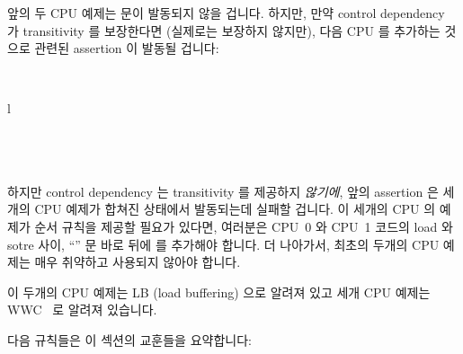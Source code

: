 \begin{enumerate}
앞의 두 CPU 예제는  문이 발동되지 않을 겁니다.
하지만, 만약 control dependency 가 transitivity 를 보장한다면 (실제로는
보장하지 않지만), 다음 CPU 를 추가하는 것으로 관련된 assertion 이 발동될
겁니다:

\vspace{5pt}
\begin{minipage}[t]{\columnwidth}
\tt
\scriptsize
\begin{tabular}{l}
	 \\
	\hline
	 \\
	 \\
	 \\
\end{tabular}
\end{minipage}
\vspace{5pt}

하지만 control dependency 는 transitivity 를 제공하지 \emph{않기에}, 앞의 assertion 은 세개의 CPU 예제가 합쳐진 상태에서 발동되는데 실패할 겁니다.
이 세개의 CPU 의 예제가 순서 규칙을 제공할 필요가 있다면, 여러분은 CPU~0 와 CPU~1 코드의 load 와 sotre 사이, ``'' 문 바로 뒤에  를 추가해야 합니다.
더 나아가서, 최초의 두개의 CPU 예제는 매우 취약하고 사용되지 않아야 합니다.

이 두개의 CPU 예제는 LB (load buffering) 으로 알려져 있고 세개 CPU 예제는
WWC~\cite{Maranget2012TutorialARMPower} 로 알려져 있습니다.

다음 규칙들은 이 섹션의 교훈들을 요약합니다:

\end{enumerate}
